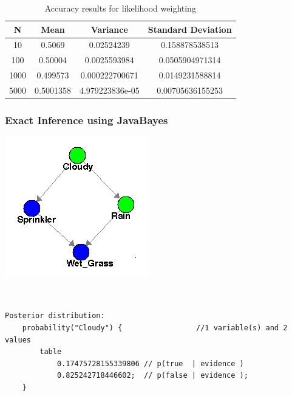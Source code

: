 \documentclass{article}
\begin{document}
\begin{table}[h]
\centering
\begin{tabular}{|c|c|c|c|}
\hline
N    & Mean      & Variance        & Standard Deviation \\ \hline
10   & 0.5069    & 0.02524239      & 0.158878538513     \\ \hline
100  & 0.50004   & 0.0025593984    & 0.0505904971314    \\ \hline
1000 & 0.499573  & 0.000222700671  & 0.0149231588814    \\ \hline
5000 & 0.5001358 & 4.979223836e-05 & 0.00705636155253   \\ \hline
\end{tabular}
\caption {Accuracy results for likelihood weighting}
\end{table}

\subsubsection{Exact Inference using JavaBayes}
\begin{minipage}{\linewidth}
\begin{center}
\includegraphics[scale=0.7]{part4_bn}
\end{center}
\end{minipage}\\

\begin{minipage}{\linewidth}
\begin{lstlisting}
Posterior distribution:
	probability("Cloudy") {                 //1 variable(s) and 2 values
		table 
			0.17475728155339806	// p(true  | evidence )
			0.825242718446602; 	// p(false | evidence );
	}
\end{lstlisting}
\end{minipage}\\
\\
\\
\end{document}
